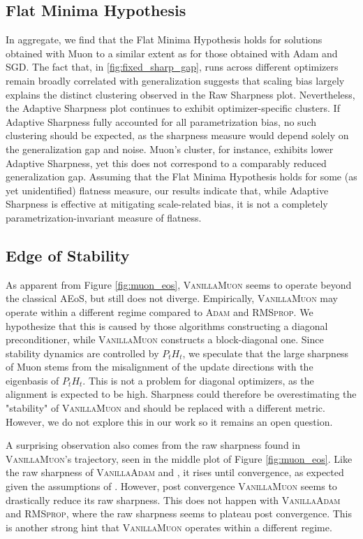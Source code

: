\documentclass{article}
\theoremstyle{plain}
\theoremstyle{definition}
\theoremstyle{remark}
\begin{document}
\subsection{Flat Minima Hypothesis}

In aggregate, we find that the Flat Minima Hypothesis holds for solutions obtained with Muon to a similar extent as for those obtained with Adam and SGD. The fact that, in \autoref{fig:fixed_sharp_gap}, runs across different optimizers remain broadly correlated with generalization suggests that scaling bias largely explains the distinct clustering observed in the Raw Sharpness plot. Nevertheless, the Adaptive Sharpness plot continues to exhibit optimizer-specific clusters. If Adaptive Sharpness fully accounted for all parametrization bias, no such clustering should be expected, as the sharpness measure would depend solely on the generalization gap and noise. Muon’s cluster, for instance, exhibits lower Adaptive Sharpness, yet this does not correspond to a comparably reduced generalization gap. Assuming that the Flat Minima Hypothesis holds for some (as yet unidentified) flatness measure, our results indicate that, while Adaptive Sharpness is effective at mitigating scale-related bias, it is not a completely parametrization-invariant measure of flatness.

\subsection{Edge of Stability}

As apparent from Figure \ref{fig:muon_eos}, \textsc{VanillaMuon} seems to operate beyond the classical AEoS, but still does not diverge. Empirically, \textsc{VanillaMuon} may operate within a different regime compared to \textsc{Adam} and \textsc{RMSprop}. We hypothesize that this is caused by those algorithms constructing a diagonal preconditioner, while \textsc{VanillaMuon} constructs a block-diagonal one. Since stability dynamics are controlled by $P_tH_t$, we speculate that the large sharpness of Muon stems from the misalignment of the update directions with the eigenbasis of $P_tH_t$. This is not a problem for diagonal optimizers, as the alignment is expected to be high. Sharpness could therefore be overestimating the "stability" of \textsc{VanillaMuon} and should be replaced with a different metric. However, we do not explore this in our work so it remains an open question.

A surprising observation also comes from the raw sharpness found in \textsc{VanillaMuon}'s trajectory, seen in the middle plot of Figure \ref{fig:muon_eos}. Like the raw sharpness of \textsc{VanillaAdam} and , it rises until convergence, as expected given the assumptions of \cite{cohen2024adaptivegradientmethodsedge}. However, post convergence \textsc{VanillaMuon} seems to drastically reduce its raw sharpness. This does not happen with \textsc{VanillaAdam} and \textsc{RMSprop}, where the raw sharpness seems to plateau post convergence. This is another strong hint that \textsc{VanillaMuon} operates within a different regime. 
\end{document}
